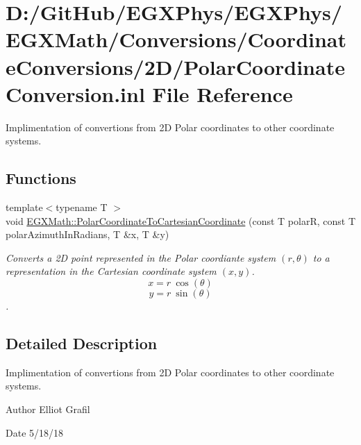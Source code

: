 \hypertarget{_polar_coordinate_conversion_8inl}{}\section{D\+:/\+Git\+Hub/\+E\+G\+X\+Phys/\+E\+G\+X\+Phys/\+E\+G\+X\+Math/\+Conversions/\+Coordinate\+Conversions/2\+D/\+Polar\+Coordinate\+Conversion.inl File Reference}
\label{_polar_coordinate_conversion_8inl}


Implimentation of convertions from 2D Polar coordinates to other coordinate systems.  


\subsection*{Functions}
\begin{DoxyCompactItemize}
\item 
{\footnotesize template$<$typename T $>$ }\\void \mbox{\hyperlink{group___e_g_x_math-_conversions-_coordinate_conversions-2_d-_polar_ga842125a118ed7788a5ceeaf796687bf6}{E\+G\+X\+Math\+::\+Polar\+Coordinate\+To\+Cartesian\+Coordinate}} (const T polarR, const T polar\+Azimuth\+In\+Radians, T \&x, T \&y)
\begin{DoxyCompactList}\small\item\em Converts a 2D point represented in the Polar coordiante system $(r,\theta)$ to a representation in the Cartesian coordinate system $(x,y)$. \[ x = r\ \cos(\theta) \] \[ y = r\ \sin(\theta) \]. \end{DoxyCompactList}\end{DoxyCompactItemize}


\subsection{Detailed Description}
Implimentation of convertions from 2D Polar coordinates to other coordinate systems. 

\begin{DoxyAuthor}{Author}
Elliot Grafil 
\end{DoxyAuthor}
\begin{DoxyDate}{Date}
5/18/18 
\end{DoxyDate}
